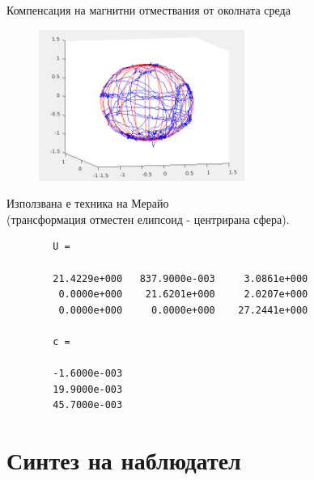 \documentclass[handout]{beamer}
\begin{document}
\begin{frame}{Компенсация на магнитни отмествания от околната среда}
	\begin{figure}[!h]
		\centering
   		\includegraphics[width=0.6\textwidth]{Images/mag_calibration.png}
	\end{figure}
	Използвана е техника на Мерайо\cite{merayo2000scalar} \\(трансформация отместен елипсоид - центрирана сфера).
\end{frame}


\begin{frame}[fragile]

	\begin{verbatim}
		U =
	
		21.4229e+000   837.9000e-003     3.0861e+000
		 0.0000e+000    21.6201e+000     2.0207e+000
		 0.0000e+000     0.0000e+000    27.2441e+000
	
		c =
	
		-1.6000e-003
		19.9000e-003
		45.7000e-003
	\end{verbatim}
	\end{frame}




\section{Синтез на наблюдател}
\end{document}
